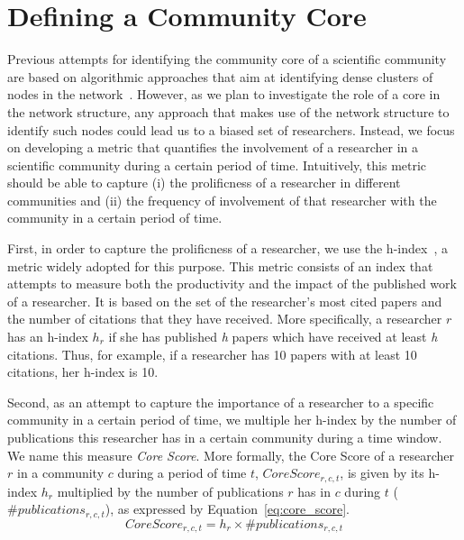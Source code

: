 \section{Defining a Community Core}

Previous attempts for identifying the community core of a scientific community are based on algorithmic approaches that aim at identifying dense clusters of nodes in the
network~\cite{Seifi:2012:CCE:2187980.2188258}.  However, as we plan to investigate the role of a core in the network structure, any approach that makes use of the network structure
to identify such nodes could lead us to a biased set of researchers. Instead, we focus on developing a metric that quantifies the involvement of a researcher in a scientific community
during a certain period of time.  Intuitively, this metric should be able to capture (i) the prolificness of a researcher in different communities and (ii) the frequency of involvement
of that researcher with the community in a certain period of time.

First, in order to capture the prolificness of a researcher, we use the h-index~\cite{Hirsch:2005}, a metric widely adopted for this purpose. This metric consists of an index that
attempts to measure both the productivity and the impact of the published work of a researcher. It is based on the set of the researcher's most cited papers and the number of
citations that they have received.  More specifically, a researcher $r$ has an h-index $h_r$ if she has published \textit{h} papers which have received at least \textit{h} citations. Thus, for
example, if a researcher has 10 papers with at least 10 citations, her h-index is 10.  

Second, as an attempt to capture the importance of a researcher to a specific community in a certain period of time, we multiple her h-index by the number of publications this
researcher has in a certain community during a time window. We name this measure \textit{Core Score}. More formally, the Core Score of a researcher $r$ in a community $c$ during a period of
time $t$, $Core{ }Score_{r,c,t}$, is given by its h-index $h_r$ multiplied by the number of publications $r$ has in $c$ during $t$ ($\textrm{\#}publications_{r,c,t}$),
as expressed by Equation~\ref{eq:core_score}. 
\vspace{-0.01cm}
\begin{equation} 
  \label{eq:core_score}
  Core{ }Score_{r,c,t} = h_r \times \textrm{\#}publications_{r,c,t}
\end{equation}

